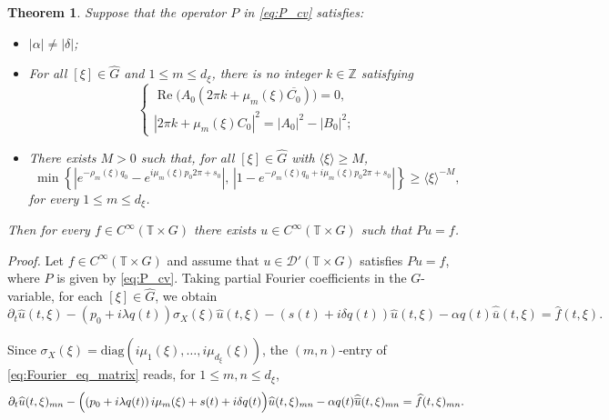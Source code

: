 \documentclass[11pt,reqno]{amsart}
\numberwithin{equation}{section}
\newtheorem{theorem}{Theorem}[section]
\begin{document}
	\begin{theorem}\label{thm:main_varcoef}
		Suppose that the operator $P$ in \eqref{eq:P_cv} satisfies:
		\begin{itemize}
			\item[(I)] $|\alpha|\neq|\delta|$;
			\item[(II)] For all $[\xi]\in\widehat{G}$ and $1\le m\le d_\xi$, there is no integer $k\in\mathbb{Z}$ satisfying
			\[
			\begin{cases}
				\operatorname{Re}\bigl(A_0(2\pi k+\mu_m(\xi)\overline{C_0})\bigr)=0,\\[2mm]
				|2\pi k+\mu_m(\xi)C_0|^2=|A_0|^2-|B_0|^2;
			\end{cases}
			\]
			\item[(III)] There exists $M>0$ such that, for all $[\xi]\in\widehat{G}$ with $\langle\xi\rangle\ge M$,
			\[
			\min\left\{
			\left|e^{-\rho_m(\xi) q_0}-e^{i\mu_m(\xi)p_0 2\pi+s_0}\right|,
			\,
			\left|1-e^{-\rho_m(\xi) q_0+i\mu_m(\xi)p_0 2\pi+s_0}\right|
			\right\}\ge \langle\xi\rangle^{-M},
			\]
			for every $1\le m\le d_\xi$.
		\end{itemize}
		
		Then for every $f\in C^\infty(\mathbb{T}\times G)$ there exists $u\in C^\infty(\mathbb{T}\times G)$ such that $Pu=f$.
	\end{theorem}



\noindent\emph{Proof.}
Let $f\in C^\infty(\mathbb{T}\times G)$ and assume that $u\in\mathcal{D}'(\mathbb{T}\times G)$ satisfies $Pu=f$, where $P$ is given by \eqref{eq:P_cv}. Taking partial Fourier coefficients in the $G$-variable, for each $[\xi]\in\widehat{G}$, we obtain
\begin{equation}\label{eq:Fourier_eq_matrix}
	\partial_t \widehat{u}(t,\xi) - (p_0 + i\lambda q(t)) \sigma_X(\xi)\widehat{u}(t,\xi)
	- (s(t)+i\delta q(t))\widehat{u}(t,\xi)
	- \alpha q(t)\widehat{\overline u}(t,\xi)
	= \widehat{f}(t,\xi).
\end{equation}

Since $\sigma_X(\xi) = \mathrm{diag}(i\mu_1(\xi),\dots,i\mu_{d_\xi}(\xi))$, the $(m,n)$-entry of \eqref{eq:Fourier_eq_matrix} reads, for $1\le m,n\le d_\xi$,
\begin{equation}\label{eq:Fourier_eq_component}
	\partial_t \widehat{u}(t,\xi)_{mn}
	-\Bigl((p_0+i\lambda q(t))\,i\mu_m(\xi)+s(t)+i\delta q(t)\Bigr)\widehat{u}(t,\xi)_{mn}
	-\alpha q(t)\widehat{\overline u}(t,\xi)_{mn}
	=\widehat{f}(t,\xi)_{mn}.
\end{equation}
\end{document}
